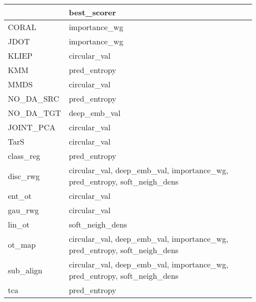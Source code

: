 \begin{tabular}{ll}
\hline
           & best\_scorer                                                              \\
\hline
 CORAL     & importance\_wg                                                            \\
 JDOT      & importance\_wg                                                            \\
 KLIEP     & circular\_val                                                             \\
 KMM       & pred\_entropy                                                             \\
 MMDS      & circular\_val                                                             \\
 NO\_DA\_SRC & pred\_entropy                                                             \\
 NO\_DA\_TGT & deep\_emb\_val                                                             \\
 JOINT\_PCA & circular\_val                                                             \\
 TarS      & circular\_val                                                             \\
 class\_reg & pred\_entropy                                                             \\
 disc\_rwg  & circular\_val, deep\_emb\_val, importance\_wg, pred\_entropy, soft\_neigh\_dens \\
 ent\_ot    & circular\_val                                                             \\
 gau\_rwg   & circular\_val                                                             \\
 lin\_ot    & soft\_neigh\_dens                                                          \\
 ot\_map    & circular\_val, deep\_emb\_val, importance\_wg, pred\_entropy, soft\_neigh\_dens \\
 sub\_align & circular\_val, deep\_emb\_val, importance\_wg, pred\_entropy, soft\_neigh\_dens \\
 tca       & pred\_entropy                                                             \\
\hline
\end{tabular}